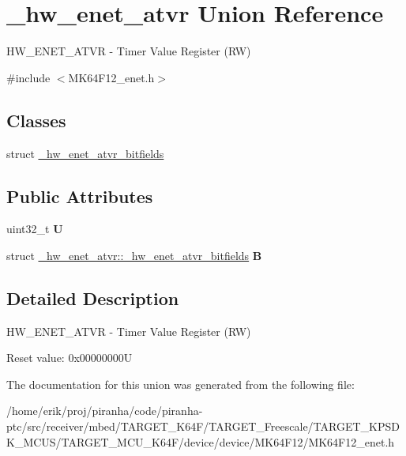 \hypertarget{union__hw__enet__atvr}{}\section{\+\_\+hw\+\_\+enet\+\_\+atvr Union Reference}
\label{union__hw__enet__atvr}


H\+W\+\_\+\+E\+N\+E\+T\+\_\+\+A\+T\+VR -\/ Timer Value Register (RW)  




{\ttfamily \#include $<$M\+K64\+F12\+\_\+enet.\+h$>$}

\subsection*{Classes}
\begin{DoxyCompactItemize}
\item 
struct \hyperlink{struct__hw__enet__atvr_1_1__hw__enet__atvr__bitfields}{\+\_\+hw\+\_\+enet\+\_\+atvr\+\_\+bitfields}
\end{DoxyCompactItemize}
\subsection*{Public Attributes}
\begin{DoxyCompactItemize}
\item 
uint32\+\_\+t {\bfseries U}\hypertarget{union__hw__enet__atvr_af85bbc2ed75f2d505f4a160b0ff83a8e}{}\label{union__hw__enet__atvr_af85bbc2ed75f2d505f4a160b0ff83a8e}

\item 
struct \hyperlink{struct__hw__enet__atvr_1_1__hw__enet__atvr__bitfields}{\+\_\+hw\+\_\+enet\+\_\+atvr\+::\+\_\+hw\+\_\+enet\+\_\+atvr\+\_\+bitfields} {\bfseries B}\hypertarget{union__hw__enet__atvr_a4c2d72237bc86ed078e514dd93d9e839}{}\label{union__hw__enet__atvr_a4c2d72237bc86ed078e514dd93d9e839}

\end{DoxyCompactItemize}


\subsection{Detailed Description}
H\+W\+\_\+\+E\+N\+E\+T\+\_\+\+A\+T\+VR -\/ Timer Value Register (RW) 

Reset value\+: 0x00000000U 

The documentation for this union was generated from the following file\+:\begin{DoxyCompactItemize}
\item 
/home/erik/proj/piranha/code/piranha-\/ptc/src/receiver/mbed/\+T\+A\+R\+G\+E\+T\+\_\+\+K64\+F/\+T\+A\+R\+G\+E\+T\+\_\+\+Freescale/\+T\+A\+R\+G\+E\+T\+\_\+\+K\+P\+S\+D\+K\+\_\+\+M\+C\+U\+S/\+T\+A\+R\+G\+E\+T\+\_\+\+M\+C\+U\+\_\+\+K64\+F/device/device/\+M\+K64\+F12/M\+K64\+F12\+\_\+enet.\+h\end{DoxyCompactItemize}
